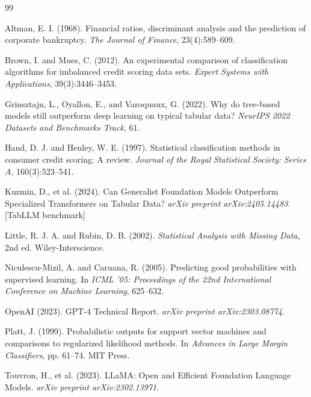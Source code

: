 \documentclass[12pt, a4paper]{article}
\begin{document}
\newpage

\begin{thebibliography}{99}

Altman, E. I. (1968).
\newblock Financial ratios, discriminant analysis and the prediction of corporate bankruptcy.
\newblock \emph{The Journal of Finance}, 23(4):589--609.

Brown, I. and Mues, C. (2012).
\newblock An experimental comparison of classification algorithms for imbalanced credit scoring data sets.
\newblock \emph{Expert Systems with Applications}, 39(3):3446--3453.

Grinsztajn, L., Oyallon, E., and Varoquaux, G. (2022).
\newblock Why do tree-based models still outperform deep learning on typical tabular data?
\newblock \emph{NeurIPS 2022 Datasets and Benchmarks Track}, 61.

Hand, D. J. and Henley, W. E. (1997).
\newblock Statistical classification methods in consumer credit scoring: A review.
\newblock \emph{Journal of the Royal Statistical Society: Series A}, 160(3):523--541.

Kuzmin, D., et al. (2024).
\newblock Can Generalist Foundation Models Outperform Specialized Transformers on Tabular Data?
\newblock \emph{arXiv preprint arXiv:2405.14483}. [TabLLM benchmark]

Little, R. J. A. and Rubin, D. B. (2002).
\newblock \emph{Statistical Analysis with Missing Data}, 2nd ed.
\newblock Wiley-Interscience.

Niculescu-Mizil, A. and Caruana, R. (2005).
\newblock Predicting good probabilities with supervised learning.
\newblock In \emph{ICML '05: Proceedings of the 22nd International Conference on Machine Learning}, 625--632.

OpenAI (2023).
\newblock GPT-4 Technical Report.
\newblock \emph{arXiv preprint arXiv:2303.08774}.

Platt, J. (1999).
\newblock Probabilistic outputs for support vector machines and comparisons to regularized likelihood methods.
\newblock In \emph{Advances in Large Margin Classifiers}, pp. 61--74. MIT Press.

Touvron, H., et al. (2023).
\newblock LLaMA: Open and Efficient Foundation Language Models.
\newblock \emph{arXiv preprint arXiv:2302.13971}.


\end{thebibliography}
\end{document}
